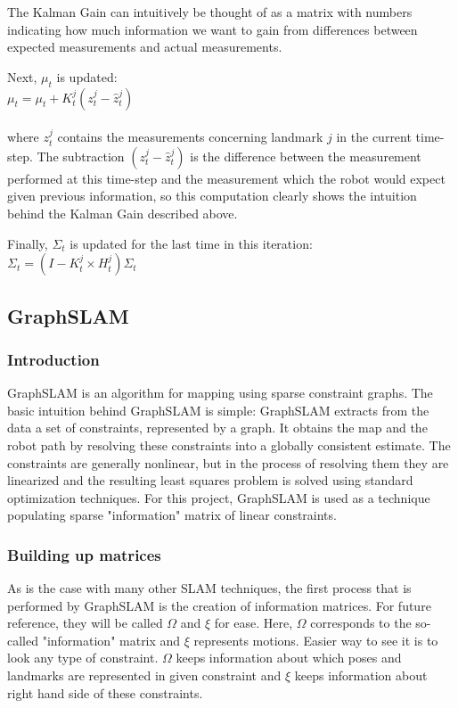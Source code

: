 \documentclass{ba-kecs}
\numberwithin{figure}{section}
\numberwithin{equation}{section}
\begin{document}
{The Kalman Gain can intuitively be thought of as a matrix with numbers indicating how much information we want to gain from differences between expected measurements and actual measurements. 

Next, $\mu_t$ is updated: \\

$\mu_t = \mu_t + K_t^j(z_t^j - \hat{z}_t^j)$ \\ \\
where $z_t^j$ contains the measurements concerning landmark $j$ in the current time-step. The subtraction $(z_t^j - \hat{z}_t^j)$ is the difference between the measurement performed at this time-step and the measurement which the robot would expect given previous information, so this computation clearly shows the intuition behind the Kalman Gain described above.

Finally, $\Sigma_t$ is updated for the last time in this iteration: \\

$\Sigma_t = (I - K_t^j \times H_t^j) \Sigma_t$




\subsection{GraphSLAM}

\subsubsection{Introduction}
GraphSLAM is an algorithm for mapping using sparse constraint graphs. The basic intuition behind GraphSLAM is simple: GraphSLAM extracts from the data a set of constraints, represented by a graph. It obtains the map and the robot path by resolving these constraints into a globally consistent estimate. The constraints are generally nonlinear, but in the process of resolving them they are linearized and the resulting least squares problem is solved using standard optimization techniques\cite{sik}. For this project, GraphSLAM is used as a technique populating sparse "information" matrix of linear constraints.

\subsubsection{Building up matrices}
As is the case with many other SLAM techniques, the first process that is performed by GraphSLAM is the creation of information matrices. For future reference, they will be called $\Omega$ and $\xi$ for ease. Here, $\Omega$ corresponds to the so-called "information" matrix and $\xi$ represents motions. Easier way to see it is to look any type of constraint. $\Omega$ keeps information about which poses and landmarks are represented in given constraint and $\xi$ keeps information about right hand side of these constraints.
	
}
\end{document}
